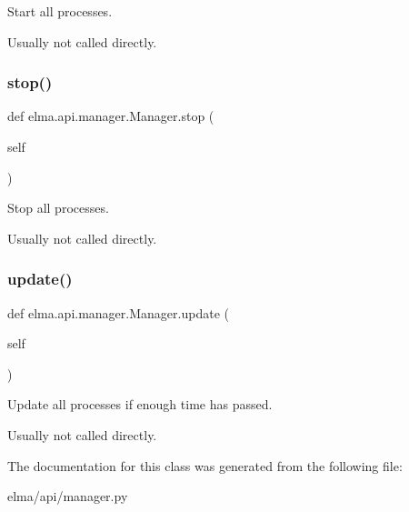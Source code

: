 Start all processes. 

Usually not called directly. \mbox{\label{classelma_1_1api_1_1manager_1_1Manager_a0feb4a517ab5840dcb6d8e15d33f22be}} 
\subsubsection{\texorpdfstring{stop()}{stop()}}
{\footnotesize\ttfamily def elma.\+api.\+manager.\+Manager.\+stop (\begin{DoxyParamCaption}\item[{}]{self }\end{DoxyParamCaption})}



Stop all processes. 

Usually not called directly. \mbox{\label{classelma_1_1api_1_1manager_1_1Manager_acb942259598dffdb074bea5171f0e2e9}} 
\subsubsection{\texorpdfstring{update()}{update()}}
{\footnotesize\ttfamily def elma.\+api.\+manager.\+Manager.\+update (\begin{DoxyParamCaption}\item[{}]{self }\end{DoxyParamCaption})}



Update all processes if enough time has passed. 

Usually not called directly. 

The documentation for this class was generated from the following file\+:\begin{DoxyCompactItemize}
\item 
elma/api/manager.\+py\end{DoxyCompactItemize}
